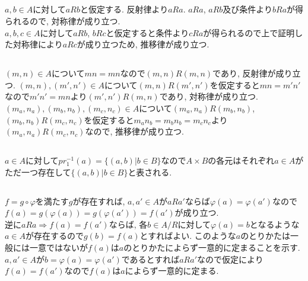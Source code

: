 \documentclass{jsarticle}
\begin{document}
\subsection{} %
$a, b \in A$に対して$aRb$と仮定する. 反射律より$aRa$. $aRa$, $aRb$及び条件より$bRa$が得られるので, 対称律が成り立つ.\\
$a, b, c \in A$に対して$aRb$, $bRc$と仮定すると条件より$cRa$が得られるので上で証明した対称律により$aRc$が成り立つため, 推移律が成り立つ.

\subsection{} %
$(m, n) \in A$について$mn = mn$なので$(m, n)R(m, n)$であり, 反射律が成り立つ. $(m, n), (m', n') \in A$について$(m, n)R(m', n')$を仮定すると$mn = m'n'$なので$m'n' = mn$より$(m', n')R(m, n)$であり, 対称律が成り立つ. $(m_a, n_a), (m_b, n_b), (m_c, n_c) \in A$について$(m_a, n_a)R(m_b, n_b)$, $(m_b, n_b)R(m_c, n_c)$を仮定すると$m_an_b = m_bn_b = m_cn_c$より$(m_a, n_a)R(m_c, n_c)$なので, 推移律が成り立つ.

\subsection{} %
$a \in A$に対して$pr_1^{-1}(a) = \{(a, b) | b \in B\}$なので$A \times B$の各元はそれぞれ$a \in A$がただ一つ存在して$\{(a, b) | b \in B\}$と表される.

\subsection{} %
$f = g \circ \varphi$を満たす$g$が存在すれば, $a, a' \in A$が$aRa'$ならば$\varphi(a) = \varphi(a')$なので$f(a) = g(\varphi(a)) = g(\varphi(a')) = f(a')$が成り立つ.\\
逆に$aRa \Rightarrow f(a) = f(a')$ならば, 各$b \in A/R$に対して$\varphi(a) = b$となるような$a \in A$が存在するので$g(b) = f(a)$とすればよい. このような$a$のとりかたは一般には一意ではないが$f(a)$は$a$のとりかたによらず一意的に定まることを示す. $a, a' \in A$が$b = \varphi(a) = \varphi(a')$であるとすれば$aRa'$なので仮定により$f(a) = f(a')$なので$f(a)$は$a$によらず一意的に定まる.
\end{document}
